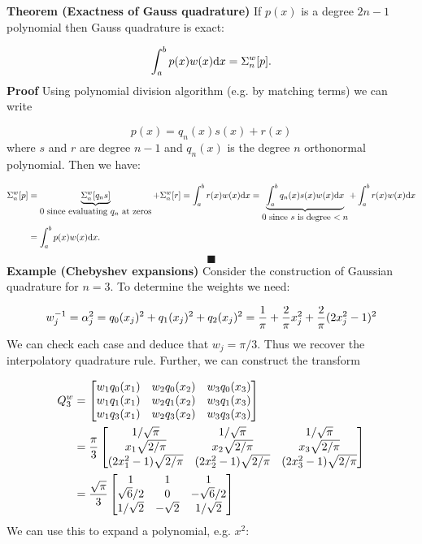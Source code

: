 \documentclass[12pt,a4paper]{article}
\begin{document}
\textbf{Theorem (Exactness of Gauss quadrature)} If $p(x)$ is a degree $2n-1$ polynomial then Gauss quadrature is exact:

\[
\ensuremath{\int}_a^b p(x)w(x) {\rm d}x = \ensuremath{\Sigma}_n^w[p].
\]
\textbf{Proof} Using polynomial division algorithm (e.g. by matching terms) we can write

\[
p(x) = q_n(x) s(x) + r(x)
\]
where $s$ and $r$ are degree $n-1$ and $q_n(x)$ is the degree $n$ orthonormal polynomial. Then we have:


\begin{align*}
\ensuremath{\Sigma}_n^w[p] &= \underbrace{\ensuremath{\Sigma}_n^w[q_n s]}_{\hbox{$0$ since evaluating $q_n$ at zeros}} + \ensuremath{\Sigma}_n^w[r] = \ensuremath{\int}_a^b r(x) w(x) {\rm d}x
= \underbrace{\ensuremath{\int}_a^b q_n(x)s(x) w(x) {\rm d}x}_{\hbox{$0$ since $s$ is degree $<n$}}  + \ensuremath{\int}_a^b r(x) w(x) {\rm d}x \\
&= \ensuremath{\int}_a^b p(x)w(x) {\rm d}x.
\end{align*}
\[
\blacksquare
\]
\textbf{Example (Chebyshev expansions)}  Consider the construction of Gaussian quadrature for $n = 3$. To determine the weights we need:

\[
w_j^{-1} = \ensuremath{\alpha}_j^2 = q_0(x_j)^2 + q_1(x_j)^2 + q_2(x_j)^2 = 
{1 \over \ensuremath{\pi}} + {2 \over \ensuremath{\pi}} x_j^2 + {2 \over \ensuremath{\pi}} (2x_j^2-1)^2
\]
We can check each case and deduce that $w_j = \ensuremath{\pi}/3$. Thus we recover the interpolatory quadrature rule. Further, we can construct the transform


\begin{align*}
Q_3^w &= \begin{bmatrix}
w_1 q_0(x_1) & w_2 q_0(x_2) & w_3 q_0(x_3) \\
w_1 q_1(x_1) & w_2 q_1(x_2) & w_3 q_1(x_3) \\
w_1 q_3(x_1) & w_2 q_3(x_2) & w_3 q_3(x_3) 
\end{bmatrix}\\
&= {\ensuremath{\pi} \over 3} \begin{bmatrix} 1/\sqrt{\ensuremath{\pi}} & 1/\sqrt{\ensuremath{\pi}} & 1/\sqrt{\ensuremath{\pi}} \\
                                x_1\sqrt{2/\ensuremath{\pi}} & x_2\sqrt{2/\ensuremath{\pi}} & x_3\sqrt{2/\ensuremath{\pi}} \\
                                (2x_1^2-1)\sqrt{2/\ensuremath{\pi}} &(2x_2^2-1)\sqrt{2/\ensuremath{\pi}} & (2x_3^2-1)\sqrt{2/\ensuremath{\pi}}
                                \end{bmatrix} \\
                                &= 
                                {\sqrt{\ensuremath{\pi}} \over 3} \begin{bmatrix} 1 & 1 & 1 \\
                                \sqrt{6}/2 & 0 & -\sqrt{6}/2 \\
                                1/\sqrt{2} &-\sqrt{2} & 1/\sqrt{2}
                                \end{bmatrix}
\end{align*}
We can use this to expand a polynomial, e.g. $x^2$:
\end{document}
